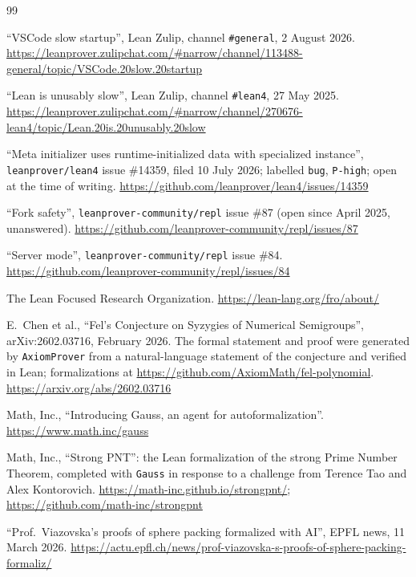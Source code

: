 \documentclass{article}
\newcommand{\Lean}{Lean\xspace}      %
\begin{document}
\begin{thebibliography}{99}

 ``VSCode slow startup'', Lean Zulip, channel \texttt{\#general}, 2 August 2026.
\url{https://leanprover.zulipchat.com/#narrow/channel/113488-general/topic/VSCode.20slow.20startup}

 ``Lean is unusably slow'', Lean Zulip, channel \texttt{\#lean4}, 27 May 2025.
\url{https://leanprover.zulipchat.com/#narrow/channel/270676-lean4/topic/Lean.20is.20unusably.20slow}

 ``Meta initializer uses runtime-initialized data with specialized instance'', \texttt{leanprover/lean4} issue \#14359, filed 10 July 2026; labelled \texttt{bug}, \texttt{P-high}; open at the time of writing.
\url{https://github.com/leanprover/lean4/issues/14359}

 ``Fork safety'', \texttt{leanprover-community/repl} issue \#87 (open since April 2025, unanswered).
\url{https://github.com/leanprover-community/repl/issues/87}

 ``Server mode'', \texttt{leanprover-community/repl} issue \#84.
\url{https://github.com/leanprover-community/repl/issues/84}

 The Lean Focused Research Organization.
\url{https://lean-lang.org/fro/about/}

 E.~Chen et al., ``Fel's Conjecture on Syzygies of Numerical Semigroups'', arXiv:2602.03716, February 2026. The formal statement and proof were generated by \texttt{AxiomProver} from a natural-language statement of the conjecture and verified in \Lean; formalizations at \url{https://github.com/AxiomMath/fel-polynomial}.
\url{https://arxiv.org/abs/2602.03716}

 Math, Inc., ``Introducing Gauss, an agent for autoformalization''.
\url{https://www.math.inc/gauss}

 Math, Inc., ``Strong PNT'': the Lean formalization of the strong Prime Number Theorem, completed with \texttt{Gauss} in response to a challenge from Terence Tao and Alex Kontorovich.
\url{https://math-inc.github.io/strongpnt/}; \url{https://github.com/math-inc/strongpnt}

 ``Prof.\ Viazovska's proofs of sphere packing formalized with AI'', EPFL news, 11 March 2026.
\url{https://actu.epfl.ch/news/prof-viazovska-s-proofs-of-sphere-packing-formaliz/}


\end{thebibliography}
\end{document}
